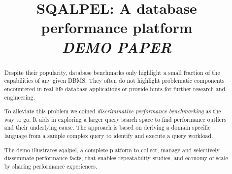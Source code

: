 \documentclass{cidr-2019}
\begin{document}
\title{SQALPEL: A database performance platform\\\emph{DEMO PAPER}}
\author{
}

\maketitle

\begin{abstract}
Despite their popularity, database benchmarks only highlight a small
fraction of the capabilities of any given DBMS. They often do not
highlight problematic components encountered in real life database
applications or provide hints for further research and engineering.



To alleviate this problem we coined \textit{discriminative performance
  benchmarking} as the way to go. It aids in exploring a larger query search
space to find performance outliers and their underlying cause. The
approach is based on deriving a domain specific language from a sample
complex query to identify and execute a query workload.

The demo illustrates {\sc sqalpel}, a complete platform to collect,
manage and selectively disseminate performance facts, that enables
repeatability studies, and economy of scale by sharing performance
experiences.

\end{abstract}
\end{document}
